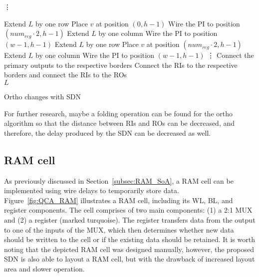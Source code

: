 \begin{algorithm}[t!]
	\vdots
	
	\begin{algorithmic}
		{
			\State Extend $L$ by one row
			\State Place $v$ at position $(0, h - 1)$
			\State Wire the PI to position $(num_{reg}\cdot2, h - 1)$ 
			\State Extend $L$ by one column
			\State Wire the PI to position $(w - 1, h - 1)$ 
			\EndIf
		}
		{
			\State Extend $L$ by one row
			\State Place $v$ at position $(num_{reg}\cdot2, h - 1)$
			\State Extend $L$ by one column
			\State Wire the PI to position $(w - 1, h - 1)$ 
			\EndIf
		}
		\State\vdots
		\EndIf
		\State Connect the primary outputs to the respective borders
		\State Connect the RIs to the respective borders and connect the RIs to the ROs\\
		\Return $L$
		
		
	\end{algorithmic}
	\caption{Ortho changes with SDN}\label{alg:seq_network}
\end{algorithm}

For further research, maybe a folding operation can be found for the ortho algorithm
so that the distance between RIs and ROs can be decreased, and therefore, the delay
produced by the SDN can be decreased as well.

\subsection{RAM cell}
As previously discussed in Section~\ref{subsec:RAM_SoA}, a RAM cell can be implemented using wire delays to temporarily store data. Figure~\ref{fig:QCA_RAM} illustrates a RAM cell, including its WL, BL, and register components. The cell comprises of two main components: (1) a 2:1 MUX and (2) a register (marked turquoise). The register transfers data from the output to one of the inputs of the MUX, which then determines whether new data should be written to the cell or if the existing data should be retained. It is worth noting that the depicted RAM cell was designed manually, however, the proposed SDN is also able to layout a RAM cell, but with the drawback of increased layout area and slower operation.

